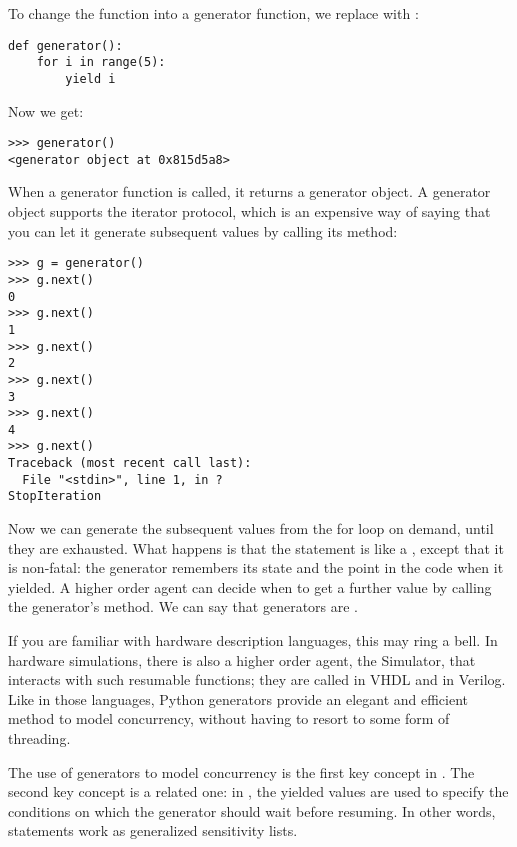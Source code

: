 To change the function into a generator function, we replace
 with :

\begin{verbatim}
def generator():
    for i in range(5):
        yield i
\end{verbatim}

Now we get:

\begin{verbatim}
>>> generator()
<generator object at 0x815d5a8>
\end{verbatim}

When a generator function is called, it returns a generator object. A
generator object supports the iterator protocol, which is an expensive
way of saying that you can let it generate subsequent values by
calling its  method:

\begin{verbatim}
>>> g = generator()
>>> g.next()
0
>>> g.next()
1
>>> g.next()
2
>>> g.next()
3
>>> g.next()
4
>>> g.next()
Traceback (most recent call last):
  File "<stdin>", line 1, in ?
StopIteration
\end{verbatim}

Now we can generate the subsequent values from the for loop on demand,
until they are exhausted. What happens is that the
 statement is like a
, except that it is non-fatal: the generator remembers
its state and the point in the code when it yielded. A higher order
agent can decide when to get a further value by calling the
generator's  method. We can say that generators are
.

If you are familiar with hardware description languages, this may ring
a bell. In hardware simulations, there is also a higher order agent,
the Simulator, that interacts with such resumable functions; they are
called 
%
 in VHDL and 
%
 in
Verilog. Like in those languages, Python generators provide an elegant
and efficient method to model concurrency, without having to resort to
some form of threading.

The use of generators to model concurrency is the first key concept in
\myhdl{}. The second key concept is a related one: in \myhdl{}, the
yielded values are used to specify the conditions on which the
generator should wait before resuming. In other words, 
statements work as generalized 
sensitivity lists. 

